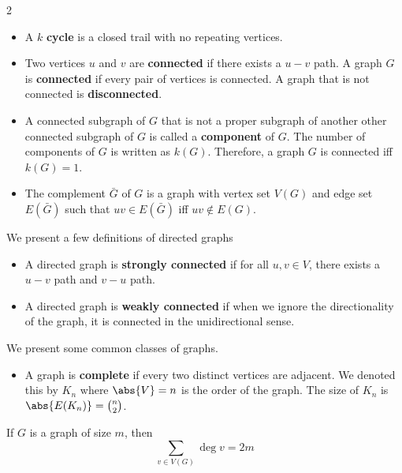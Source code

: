 \begin{multicols}{2}
\begin{definition}
\begin{itemize}
    \item A $k$ \textbf{cycle} is a closed trail with no repeating vertices. 
    \item Two vertices $u$ and $v$ are \textbf{connected} if there exists a $u-v$ path. A graph $G$ is \textbf{connected} if every pair of vertices is connected. A graph that is not connected is \textbf{disconnected}. 
    \item A connected subgraph of $G$ that is not a proper subgraph of another other connected subgraph of $G$ is called a \textbf{component} of $G$. The number of components of $G$ is written as $k(G)$. Therefore, a graph $G$ is connected iff $k(G) = 1$. 
    \item The complement $\bar{G}$ of $G$ is a graph with vertex set $V(G)$ and edge set $E(\bar{G})$ such that $uv \in E(\bar{G})$ iff $uv \notin E(G)$. 
\end{itemize}
    
\end{definition}

\begin{definition}
    We present a few definitions of directed graphs
    \begin{itemize}
        \item A directed graph is \textbf{strongly connected} if for all $u,v \in V$, there exists a $u-v$ path and $v-u$ path. 
        \item A directed graph is \textbf{weakly connected} if when we ignore the directionality of the graph, it is connected in the unidirectional sense. 
    \end{itemize}
\end{definition}
\begin{definition} We present some common classes of graphs. 
\begin{itemize}
    \item A graph is \textbf{complete} if every two distinct vertices are adjacent. We denoted this by $K_n$ where $\abs{V} = n$ is the order of the graph. The size of $K_n$ is $\abs{E(K_n)} = {n\choose 2}$. 
\end{itemize}
\end{definition}
\begin{theorem}
If $G$ is a graph of size $m$, then 
$$
\sum_{v\in V(G)}\deg v = 2m
$$
    
\end{theorem}
\end{multicols}


